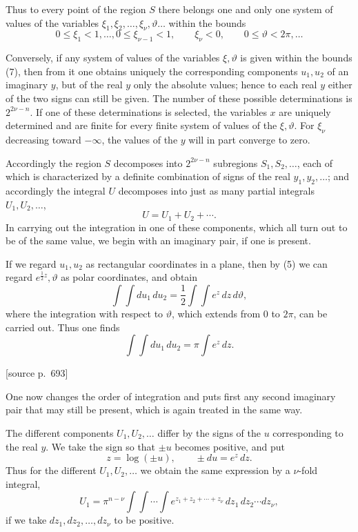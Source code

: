 \documentclass[11pt]{article}
\newcommand{\srcpage}[1]{\par\medskip\noindent\textsf{[source p.~#1]}\par\smallskip}
\begin{document}
Thus to every point of the region $S$ there belongs one and only one system of values of the variables $\xi_1,\xi_2,\ldots,\xi_\nu,\vartheta\ldots$ within the bounds
\begin{equation}
0\leq\xi_1<1,\ldots,
0\leq\xi_{\nu-1}<1,
\qquad
\xi_\nu<0,
\qquad
0\leq\vartheta<2\pi,\ldots
\tag{7}
\end{equation}

Conversely, if any system of values of the variables $\xi,\vartheta$ is given within the bounds (7), then from it one obtains uniquely the corresponding components $u_1,u_2$ of an imaginary $y$, but of the real $y$ only the absolute values; hence to each real $y$ either of the two signs can still be given. The number of these possible determinations is $2^{2\nu-n}$. If one of these determinations is selected, the variables $x$ are uniquely determined and are finite for every finite system of values of the $\xi,\vartheta$. For $\xi_\nu$ decreasing toward $-\infty$, the values of the $y$ will in part converge to zero.

Accordingly the region $S$ decomposes into $2^{2\nu-n}$ subregions $S_1,S_2,\ldots$, each of which is characterized by a definite combination of signs of the real $y_1,y_2,\ldots$; and accordingly the integral $U$ decomposes into just as many partial integrals $U_1,U_2,\ldots$,
\[
U=U_1+U_2+\cdots.
\]
In carrying out the integration in one of these components, which all turn out to be of the same value, we begin with an imaginary pair, if one is present.

If we regard $u_1,u_2$ as rectangular coordinates in a plane, then by (5) we can regard $e^{\frac12 z},\vartheta$ as polar coordinates, and obtain
\[
\int\!\int du_1\,du_2=\frac12\int\!\int e^z\,dz\,d\vartheta,
\]
where the integration with respect to $\vartheta$, which extends from 0 to $2\pi$, can be carried out. Thus one finds
\[
\int\!\int du_1\,du_2=\pi\int e^z\,dz.
\]

\srcpage{693}
One now changes the order of integration and puts first any second imaginary pair that may still be present, which is again treated in the same way.

The different components $U_1,U_2,\ldots$ differ by the signs of the $u$ corresponding to the real $y$. We take the sign so that $\pm u$ becomes positive, and put
\begin{equation}
z=\log(\pm u),
\qquad \pm du=e^z\,dz.
\tag{8}
\end{equation}
Thus for the different $U_1,U_2,\ldots$ we obtain the same expression by a $\nu$-fold integral,
\begin{equation}
U_1=\pi^{n-\nu}\int\!\int\cdots\int e^{z_1+z_2+\cdots+z_\nu}\,dz_1\,dz_2\cdots dz_\nu,
\tag{9}
\end{equation}
if we take $dz_1,dz_2,\ldots,dz_\nu$ to be positive.
\end{document}
